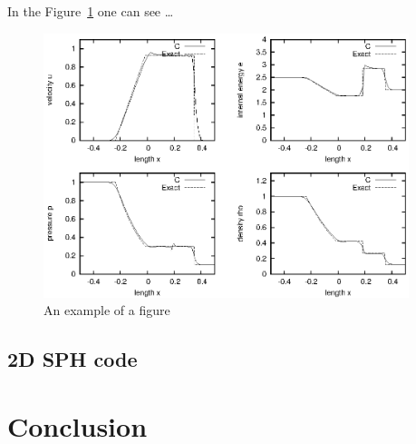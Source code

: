 \documentclass{report}
\begin{document}
In the Figure~\ref{fig:1dshock} one can see \ldots

\begin{figure}[h]
  \centering
  \includegraphics[width=0.95\textwidth]{img/1dshock.eps}
  \caption{An example of a figure}
  \label{fig:1dshock}
\end{figure}

\section{2D SPH code}



\chapter{Conclusion}
\label{sec:conclusion}

\listoffigures



\end{document}
